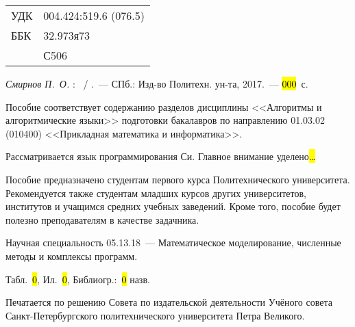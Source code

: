 


\noindent
\begin{tabular}{ll}
УДК & 004.424:519.6 (076.5)\\
ББК & 32.973я73\\
    & С506 \\
\end{tabular}

\vskip1cm

\textit{Смирнов П.~О.} \textbf{\@title}: \MakeLowercase{\@subtitle}~/ \@author.~---
СПб.: Изд-во Политехн. ун-та, 2017.~--- \hl{000}~с.
\vskip1cm

Пособие соответствует 
содержанию разделов дисциплины <<Алгоритмы и алгоритмические языки>>
подготовки бакалавров по направлению 01.03.02 (010400) <<Прикладная математика
и информатика>>.

Рассматривается язык программирования Си. Главное внимание уделено\hl{\dots}

Пособие предназначено студентам первого курса Политехнического университета.
Рекомендуется также студентам младших курсов других университетов, институтов
и учащимся средних учебных заведений. Кроме того, пособие будет полезно
преподавателям в качестве задачника.

Научная специальность 05.13.18~--- Математическое моделирование, численные
методы и комплексы программ.

\vskip1cm

Табл.~\hl{0}, Ил.~\hl{0}, Библиогр.:~\hl{0} назв.

\vskip1cm

Печатается по решению Совета по издательской деятельности Учёного совета
Санкт-Петербургского политехнического университета Петра Великого.

